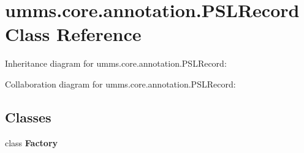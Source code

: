 \hypertarget{classumms_1_1core_1_1annotation_1_1_p_s_l_record}{\section{umms.\+core.\+annotation.\+P\+S\+L\+Record Class Reference}
\label{classumms_1_1core_1_1annotation_1_1_p_s_l_record}
}


Inheritance diagram for umms.\+core.\+annotation.\+P\+S\+L\+Record\+:


Collaboration diagram for umms.\+core.\+annotation.\+P\+S\+L\+Record\+:
\subsection*{Classes}
\begin{DoxyCompactItemize}
\item 
class {\bfseries Factory}
\end{DoxyCompactItemize}
